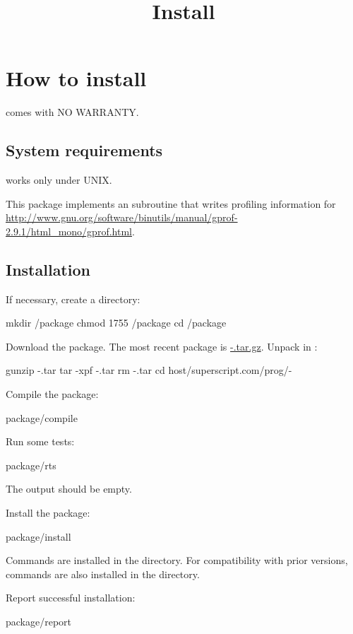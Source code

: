 \documentclass{book}
\title{Install}
\begin{document}
\section{How to install \package}

\package{} comes with NO WARRANTY.

\subsection{System requirements}
\package{} works only under UNIX.

This package implements an  subroutine that writes profiling
information for
\href{gprof}{http://www.gnu.org/software/binutils/manual/gprof-2.9.1/html_mono/gprof.html}.

\subsection{Installation}
If necessary, create a  directory:
\begin{code}%
  mkdir /package
  chmod 1755 /package
  cd /package
\end{code}

Download the \package{} package.  The most recent \package{} package is
\href{\package~\version}{\package-\version.tar.gz}.  Unpack \package{} in
:
\begin{code}%
  gunzip \package-\version.tar
  tar -xpf \package-\version.tar
  rm \package-\version.tar
  cd host/superscript.com/prog/\package-\version
\end{code}

Compile the package:
\begin{code}%
  package/compile
\end{code}

Run some tests:
\begin{code}%
  package/rts
\end{code}
The output should be empty.

Install the package:
\begin{code}%
  package/install
\end{code}

Commands are installed in the
 directory.
For compatibility with prior versions, commands are also installed in
the  directory.

Report successful installation:
\begin{code}%
  package/report
\end{code}
\end{document}
